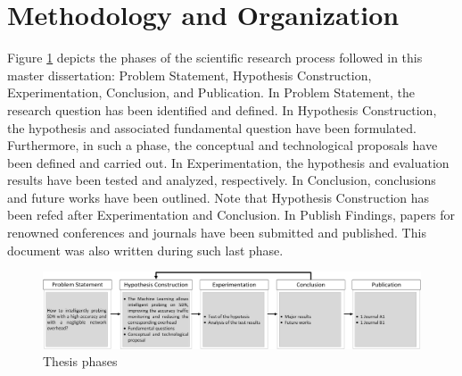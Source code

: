 \section{Methodology and Organization}
\label{sec:methodology}

Figure \ref{fig:scientific_research_process} depicts the phases of the scientific research process followed in this master dissertation: Problem Statement, Hypothesis Construction, Experimentation, Conclusion, and Publication. In Problem Statement, the research question has been identified and defined. In Hypothesis Construction, the hypothesis and associated fundamental question have been formulated. Furthermore, in such a phase, the conceptual and technological proposals have been defined and carried out. In Experimentation, the hypothesis and evaluation results have been tested and analyzed, respectively. In Conclusion, conclusions and future works have been outlined. Note that Hypothesis Construction has been refed after Experimentation and Conclusion. In Publish Findings, papers for renowned conferences and journals have been submitted and published. This document was also written during such last phase.

\begin{figure}[!ht]
    \centering
    \includegraphics[width=1.0\columnwidth]{figures/scientific_research_process}
    \caption{Thesis phases}
    \label{fig:scientific_research_process}
\end{figure}

